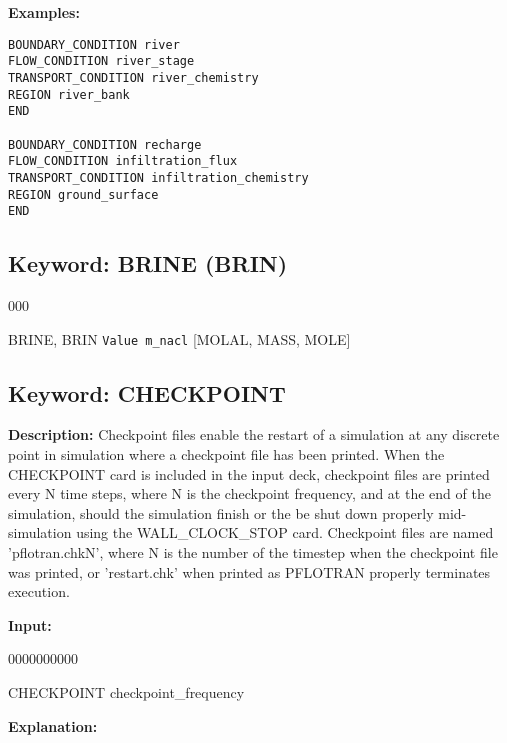 \documentclass[12pt]{article}
\begin{document}
\bigskip

{\noindent\bf Examples:}
\begin{verbatim}
BOUNDARY_CONDITION river
FLOW_CONDITION river_stage
TRANSPORT_CONDITION river_chemistry
REGION river_bank
END

BOUNDARY_CONDITION recharge
FLOW_CONDITION infiltration_flux
TRANSPORT_CONDITION infiltration_chemistry
REGION ground_surface
END
\end{verbatim}


\newpage
\protect\hypertarget{target_brine}{}

\subsection{Keyword: BRINE (BRIN)}

\begin{deflist}{000}
\item[BRINE, BRIN] {\tt Value m\_nacl} [MOLAL, MASS, MOLE]
\end{deflist}


\newpage
\protect\hypertarget{target_ckpt}{}

\subsection{Keyword: CHECKPOINT}
{\noindent\bf Description:}
Checkpoint files enable the restart of a simulation at any discrete point in simulation where a checkpoint file has been printed.  When the CHECKPOINT card is included in the input deck, checkpoint files are printed every N time steps, where N is the checkpoint frequency, and at the end of the simulation, should the simulation finish or the be shut down properly mid-simulation using the WALL\_CLOCK\_STOP card.  Checkpoint files are named 'pflotran.chkN', where N is the number of the timestep when the checkpoint file was printed, or 'restart.chk' when printed as PFLOTRAN properly terminates execution.

{\noindent\bf Input:}

\begin{deflist}{0000000000}
\item [CHECKPOINT] checkpoint\_frequency
\end{deflist}

{\noindent\bf Explanation:}
\end{document}

